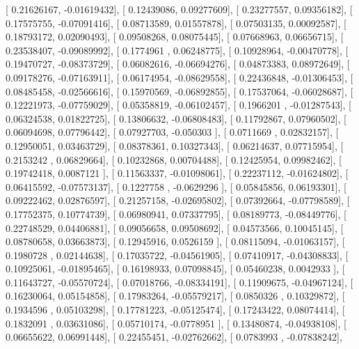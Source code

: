 \documentclass{article}
\begin{document}
       [ 0.21626167, -0.01619432],
       [ 0.12439086,  0.09277609],
       [ 0.23277557,  0.09356182],
       [ 0.17575755, -0.07091416],
       [ 0.08713589,  0.01557878],
       [ 0.07503135,  0.00092587],
       [ 0.18793172,  0.02090493],
       [ 0.09508268,  0.08075445],
       [ 0.07668963,  0.06656715],
       [ 0.23538407, -0.09089992],
       [ 0.1774961 ,  0.06248775],
       [ 0.10928964, -0.00470778],
       [ 0.19470727, -0.08373729],
       [ 0.06082616, -0.06694276],
       [ 0.04873383,  0.08972649],
       [ 0.09178276, -0.07163911],
       [ 0.06174954, -0.08629558],
       [ 0.22436848, -0.01306453],
       [ 0.08485458, -0.02566616],
       [ 0.15970569, -0.06892855],
       [ 0.17537064, -0.06028687],
       [ 0.12221973, -0.07759029],
       [ 0.05358819, -0.06102457],
       [ 0.1966201 , -0.01287543],
       [ 0.06324538,  0.01822725],
       [ 0.13806632, -0.06808483],
       [ 0.11792867,  0.07960502],
       [ 0.06094698,  0.07796442],
       [ 0.07927703, -0.050303  ],
       [ 0.0711669 ,  0.02832157],
       [ 0.12950051,  0.03463729],
       [ 0.08378361,  0.10327343],
       [ 0.06214637,  0.07715954],
       [ 0.2153242 ,  0.06829664],
       [ 0.10232868,  0.00704488],
       [ 0.12425954,  0.09982462],
       [ 0.19742418,  0.0087121 ],
       [ 0.11563337, -0.01098061],
       [ 0.22237112, -0.01624802],
       [ 0.06415592, -0.07573137],
       [ 0.1227758 , -0.0629296 ],
       [ 0.05845856,  0.06193301],
       [ 0.09222462,  0.02876597],
       [ 0.21257158, -0.02695802],
       [ 0.07392664, -0.07798589],
       [ 0.17752375,  0.10774739],
       [ 0.06980941,  0.07337795],
       [ 0.08189773, -0.08449776],
       [ 0.22748529,  0.04406881],
       [ 0.09056658,  0.09508692],
       [ 0.04573566,  0.10045145],
       [ 0.08780658,  0.03663873],
       [ 0.12945916,  0.0526159 ],
       [ 0.08115094, -0.01063157],
       [ 0.1980728 ,  0.02144638],
       [ 0.17035722, -0.04561905],
       [ 0.07410917, -0.04308833],
       [ 0.10925061, -0.01895465],
       [ 0.16198933,  0.07098845],
       [ 0.05460238,  0.0042933 ],
       [ 0.11643727, -0.05570724],
       [ 0.07018766, -0.08334191],
       [ 0.11909675, -0.04967124],
       [ 0.16230064,  0.05154858],
       [ 0.17983264, -0.05579217],
       [ 0.0850326 ,  0.10329872],
       [ 0.1934596 ,  0.05103298],
       [ 0.17781223, -0.05125474],
       [ 0.17243422,  0.08074414],
       [ 0.1832091 ,  0.03631086],
       [ 0.05710174, -0.0778951 ],
       [ 0.13480874, -0.04938108],
       [ 0.06655622,  0.06991448],
       [ 0.22455451, -0.02762662],
       [ 0.0783993 , -0.07838242],
\end{document}
